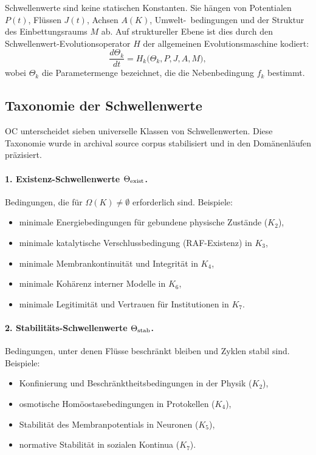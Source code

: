 Schwellenwerte sind keine statischen Konstanten.
Sie hängen von Potentialen \(P(t)\), Flüssen \(J(t)\), Achsen \(A(K)\), Umwelt-\
bedingungen und der Struktur des Einbettungsraums \(M\) ab.
Auf struktureller Ebene ist dies durch den Schwellenwert-Evolutionsoperator
\(H\) der allgemeinen Evolutionsmaschine kodiert:
\[
  \frac{d\Theta_k}{dt}
   = H_k\big(\Theta_k, P, J, A, M\big),
\]
wobei \(\Theta_k\) die Parametermenge bezeichnet, die die Nebenbedingung \(f_k\) bestimmt.

\subsection{Taxonomie der Schwellenwerte}

OC unterscheidet sieben universelle Klassen von Schwellenwerten. Diese Taxonomie wurde
in archival source corpus stabilisiert und in den Domänenläufen präzisiert.

\paragraph{1. Existenz-Schwellenwerte \(\Theta_{\rm exist}\).}
Bedingungen, die für \(\Omega(K)\neq\emptyset\) erforderlich sind.
Beispiele:
\begin{itemize}
    \item minimale Energiebedingungen für gebundene physische Zustände (\(K_2\)),
    \item minimale katalytische Verschlussbedingung (RAF-Existenz) in \(K_3\),
    \item minimale Membrankontinuität und Integrität in \(K_4\),
    \item minimale Kohärenz interner Modelle in \(K_6\),
    \item minimale Legitimität und Vertrauen für Institutionen in \(K_7\).
\end{itemize}

\paragraph{2. Stabilitäts-Schwellenwerte \(\Theta_{\rm stab}\).}
Bedingungen, unter denen Flüsse beschränkt bleiben und Zyklen stabil sind.
Beispiele:
\begin{itemize}
    \item Konfinierung und Beschränktheitsbedingungen in der Physik (\(K_2\)),
    \item osmotische Homöostasebedingungen in Protokellen (\(K_4\)),
    \item Stabilität des Membranpotentials in Neuronen (\(K_5\)),
    \item normative Stabilität in sozialen Kontinua (\(K_7\)).
\end{itemize}

